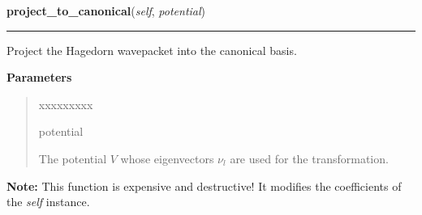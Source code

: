 \hspace{.8\funcindent}\begin{boxedminipage}{\funcwidth}

    \raggedright \textbf{project\_to\_canonical}(\textit{self}, \textit{potential})

    \vspace{-1.5ex}

    \rule{\textwidth}{0.5\fboxrule}
\setlength{\parskip}{2ex}
    Project the Hagedorn wavepacket into the canonical basis.

\setlength{\parskip}{1ex}
      \textbf{Parameters}
      \vspace{-1ex}

      \begin{quote}
        \begin{Ventry}{xxxxxxxxx}

          \item[potential]

          The potential $V$ whose eigenvectors $\nu_l$ are used for the
          transformation.

        \end{Ventry}

      \end{quote}

\textbf{Note:} This function is expensive and destructive! It modifies the coefficients of
the \textit{self} instance.



    \end{boxedminipage}

    \label{HagedornWavepacket:HagedornWavepacket:project_to_eigen}

    \vspace{0.5ex}

